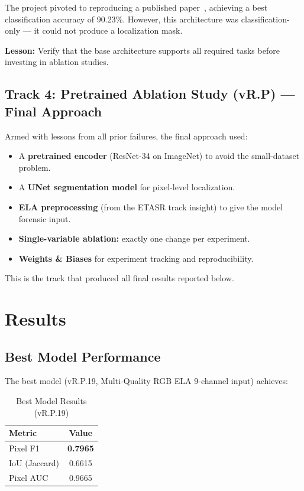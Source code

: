 \documentclass[conference]{IEEEtran}
\begin{document}
The project pivoted to reproducing a published paper~\cite{nagm2024etasr}, achieving a best classification accuracy of 90.23\%. However, this architecture was classification-only --- it could not produce a localization mask.

\textbf{Lesson:} Verify that the base architecture supports all required tasks before investing in ablation studies.

\subsection{Track 4: Pretrained Ablation Study (vR.P) --- Final Approach}

Armed with lessons from all prior failures, the final approach used:
\begin{itemize}
    \item A \textbf{pretrained encoder} (ResNet-34 on ImageNet) to avoid the small-dataset problem.
    \item A \textbf{UNet segmentation model} for pixel-level localization.
    \item \textbf{ELA preprocessing} (from the ETASR track insight) to give the model forensic input.
    \item \textbf{Single-variable ablation:} exactly one change per experiment.
    \item \textbf{Weights \& Biases} for experiment tracking and reproducibility.
\end{itemize}

This is the track that produced all final results reported below.


\section{Results}

\subsection{Best Model Performance}

The best model (vR.P.19, Multi-Quality RGB ELA 9-channel input) achieves:

\begin{table}[H]
\centering
\caption{Best Model Results (vR.P.19)}
\label{tab:best_results}
\begin{tabular}{l c}
\toprule
\textbf{Metric} & \textbf{Value} \\
\midrule
Pixel F1 & \textbf{0.7965} \\
IoU (Jaccard) & 0.6615 \\
Pixel AUC & 0.9665 \\
\bottomrule
\end{tabular}
\end{table}
\end{document}
